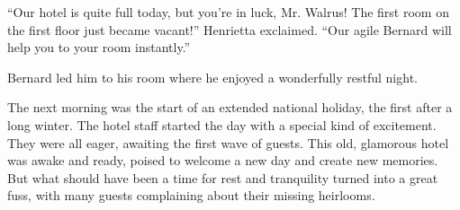 ``Our hotel is quite full today, but you're in luck, Mr. Walrus! The first room on the first floor just became vacant!'' Henrietta exclaimed. ``Our agile Bernard will help you to your room instantly.''

Bernard led him to his room where he enjoyed a wonderfully restful night.

\vspace{4em}
The next morning was the start of an extended national holiday, the first after a long winter. The hotel staff started the day with a special kind of excitement. They were all eager, awaiting the first wave of guests. This old, glamorous hotel was awake and ready, poised to welcome a new day and create new memories. But what should have been a time for rest and tranquility turned into a great fuss, with many guests complaining about their missing heirlooms.
